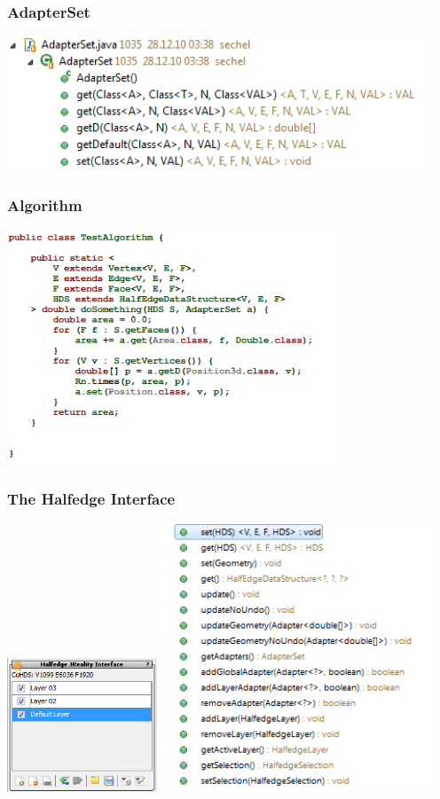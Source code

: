 \documentclass[12pt]{beamer}
\begin{document}
\begin{frame}
\frametitle{AdapterSet}
\begin{center}
\includegraphics[height=4cm]{adapterset.png}\\	
\end{center}
\end{frame}

\begin{frame}
\frametitle{Algorithm}
\includegraphics[height=7cm]{algorithm.png}\\	
\end{frame}

\begin{frame}
\frametitle{The Halfedge Interface}
\includegraphics[height=4cm]{interface02.png}
\includegraphics[height=8cm]{interface.png}
\end{frame}
\end{document}

